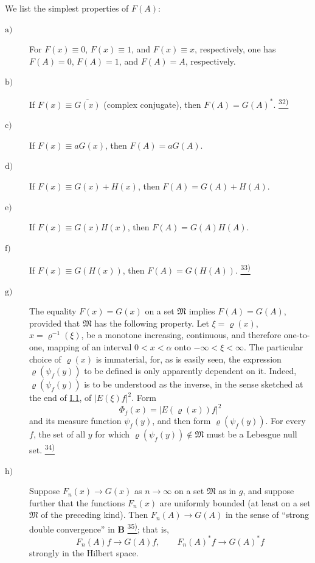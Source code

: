 \documentclass[12pt,b5paper,twoside]{article}
\newcommand{\noteref}[1]{%
  \hyperlink{note:#1}{\textsuperscript{#1)}}}
\begin{document}
We list the simplest properties of \(F(A)\):
\begin{description}
 \item[\(\mathrm{a})\)] \label{prop:II.2.a}For \(F(x)\equiv0\), \(F(x)\equiv1\), and
 \(F(x)\equiv x\), respectively, one has \(F(A)=0\), \(F(A)=1\), and
 \(F(A)=A\), respectively.
 \item[\(\mathrm{b})\)] \label{prop:II.2.b}If \(F(x)\equiv\overline{G(x)}\) (complex
 conjugate), then \(F(A)=G(A)^*\).\noteref{32}
 \item[\(\mathrm{c})\)] \label{prop:II.2.c}If \(F(x)\equiv aG(x)\), then \(F(A)=aG(A)\).
 \item[\(\mathrm{d})\)] \label{prop:II.2.d}If \(F(x)\equiv G(x)+H(x)\), then
 \(F(A)=G(A)+H(A)\).
 \item[\(\mathrm{e})\)] \label{prop:II.2.e}If \(F(x)\equiv G(x)H(x)\), then
 \(F(A)=G(A)H(A)\).
 \item[\(\mathrm{f})\)] \label{prop:II.2.f}If \(F(x)\equiv G(H(x))\), then
 \(F(A)=G(H(A))\).\noteref{33}
 \item[\(\mathrm{g})\)] \label{prop:II.2.g}The equality \(F(x)=G(x)\) on a set
 \(\mathfrak M\) implies \(F(A)=G(A)\), provided that
 \(\mathfrak M\) has the following property.  Let
 \(\xi=\varrho(x)\), \(x=\varrho^{-1}(\xi)\), be a monotone increasing,
 continuous, and therefore one-to-one, mapping of an interval
 \(0<x<\alpha\) onto \(-\infty<\xi<\infty\).  The particular choice of
 \(\varrho(x)\) is immaterial, for, as is easily seen, the expression
 \(\varrho(\psi_f(y))\) to be defined is only apparently dependent on it.
 Indeed, \(\varrho(\psi_f(y))\) is to be understood as the inverse, in the
 sense sketched at the end of \hyperref[sec:I.1]{I.1}, of
 \(|E(\xi)f|^2\).  Form
 \[
   \Phi_f(x)=|E(\varrho(x))f|^2
 \]
 and its measure function \(\psi_f(y)\), and then form
 \(\varrho(\psi_f(y))\).  For every \(f\), the set of all \(y\) for which
 \(\varrho(\psi_f(y))\notin\mathfrak M\) must be a Lebesgue null
 set.\noteref{34}
 \item[\(\mathrm{h})\)] \label{prop:II.2.h}Suppose \(F_n(x)\to G(x)\) as \(n\to\infty\)
 on a set \(\mathfrak M\) as in \(g\), and suppose further that the
 functions \(F_n(x)\) are uniformly bounded (at least on a set
 \(\mathfrak M\) of the preceding kind).  Then \(F_n(A)\to G(A)\) in
the sense of ``strong double convergence'' in \(\mathbf B\)\noteref{35};
 that is,
 \[
   F_n(A)f\longrightarrow G(A)f,
   \qquad F_n(A)^*f\longrightarrow G(A)^*f
 \]
 strongly in the Hilbert space.
\end{description}
\end{document}
